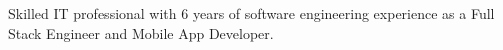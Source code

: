\documentclass[letter,10pt]{article}
\begin{document}

Skilled IT professional with 6 years of software engineering experience as a Full Stack Engineer and Mobile App Developer. 
\end{document}
